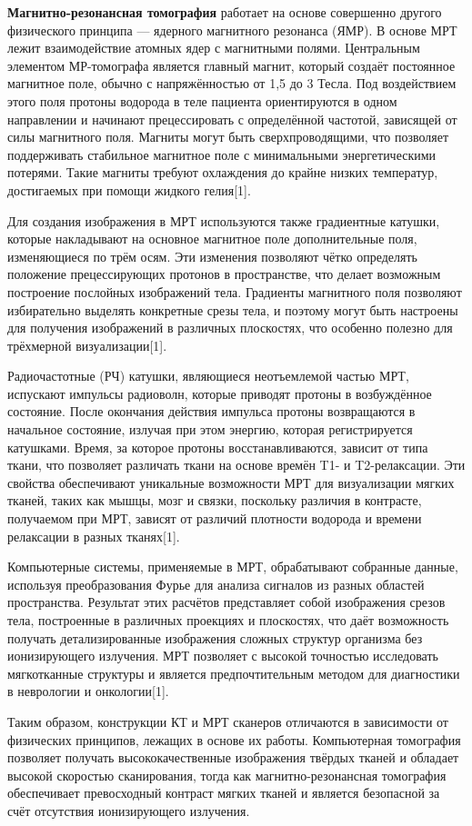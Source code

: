 \textbf{Магнитно-резонансная томография} работает на основе совершенно другого физического принципа — ядерного магнитного резонанса (ЯМР). В основе МРТ лежит взаимодействие атомных ядер с магнитными полями. Центральным элементом МР-томографа является главный магнит, который создаёт постоянное магнитное поле, обычно с напряжённостью от 1,5 до 3 Тесла. Под воздействием этого поля протоны водорода в теле пациента ориентируются в одном направлении и начинают прецессировать с определённой частотой, зависящей от силы магнитного поля. Магниты могут быть сверхпроводящими, что позволяет поддерживать стабильное магнитное поле с минимальными энергетическими потерями. Такие магниты требуют охлаждения до крайне низких температур, достигаемых при помощи жидкого гелия[1].

Для создания изображения в МРТ используются также градиентные катушки, которые накладывают на основное магнитное поле дополнительные поля, изменяющиеся по трём осям. Эти изменения позволяют чётко определять положение прецессирующих протонов в пространстве, что делает возможным построение послойных изображений тела. Градиенты магнитного поля позволяют избирательно выделять конкретные срезы тела, и поэтому могут быть настроены для получения изображений в различных плоскостях, что особенно полезно для трёхмерной визуализации[1].

Радиочастотные (РЧ) катушки, являющиеся неотъемлемой частью МРТ, испускают импульсы радиоволн, которые приводят протоны в возбуждённое состояние. После окончания действия импульса протоны возвращаются в начальное состояние, излучая при этом энергию, которая регистрируется катушками. Время, за которое протоны восстанавливаются, зависит от типа ткани, что позволяет различать ткани на основе времён T1- и T2-релаксации. Эти свойства обеспечивают уникальные возможности МРТ для визуализации мягких тканей, таких как мышцы, мозг и связки, поскольку различия в контрасте, получаемом при МРТ, зависят от различий плотности водорода и времени релаксации в разных тканях[1].

Компьютерные системы, применяемые в МРТ, обрабатывают собранные данные, используя преобразования Фурье для анализа сигналов из разных областей пространства. Результат этих расчётов представляет собой изображения срезов тела, построенные в различных проекциях и плоскостях, что даёт возможность получать детализированные изображения сложных структур организма без ионизирующего излучения. МРТ позволяет с высокой точностью исследовать мягкотканные структуры и является предпочтительным методом для диагностики в неврологии и онкологии[1].

Таким образом, конструкции КТ и МРТ сканеров отличаются в зависимости от физических принципов, лежащих в основе их работы. Компьютерная томография позволяет получать высококачественные изображения твёрдых тканей и обладает высокой скоростью сканирования, тогда как магнитно-резонансная томография обеспечивает превосходный контраст мягких тканей и является безопасной за счёт отсутствия ионизирующего излучения.

